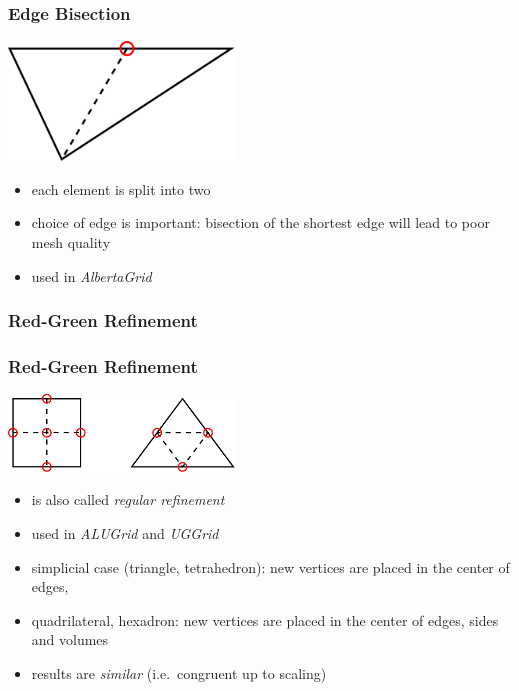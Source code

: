 \begin{frame}
  \frametitle<presentation>{Edge Bisection}
  \begin{center}
    \includegraphics[width=0.45\textwidth]{EPS/adaptivity/bisection}
  \end{center}
  \begin{itemize}
    \item each element is split into two
    \item choice of edge is important: \newline
      bisection of the shortest edge will lead to poor mesh quality
    \item used in \emph{AlbertaGrid}
  \end{itemize}
\end{frame}

\subsubsection*{Red-Green Refinement}

\begin{frame}
  \frametitle<presentation>{Red-Green Refinement}
  \begin{center}
    \includegraphics[width=0.45\textwidth]{EPS/adaptivity/redgreen}
  \end{center}
  \begin{itemize}
    \item is also called \emph{regular refinement}
    \item used in \emph{ALUGrid} and \emph{UGGrid}
    \item simplicial case (triangle, tetrahedron): \newline
      new vertices are placed in the center of edges,
    \item quadrilateral, hexadron: new vertices are placed in the center of edges, sides and volumes
    \item results are \emph{similar} (i.e.~congruent up to scaling)
  \end{itemize}
\end{frame}

